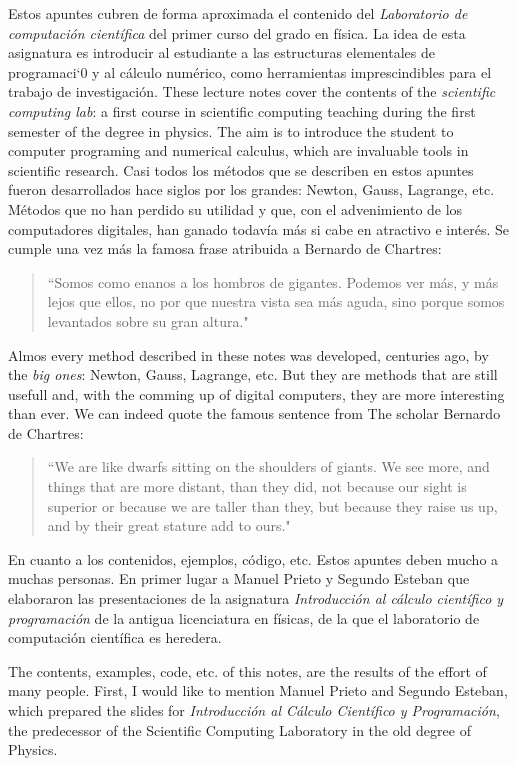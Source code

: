 \begin{paracol}{2}
Estos apuntes cubren de forma aproximada  el contenido del \emph{Laboratorio de computación científica} del primer curso del grado en física.
La idea de esta asignatura es  introducir al estudiante a las estructuras elementales de programaci`0 y al cálculo numérico, como herramientas imprescindibles para el trabajo de investigación.
\switchcolumn
These lecture notes cover the contents  of the \emph{scientific computing lab}: a first course in scientific computing teaching during the first semester of the degree in physics. The aim is to introduce the student to computer programing and numerical calculus, which are invaluable tools in scientific research.
\switchcolumn         
Casi todos los métodos que se describen en estos apuntes fueron desarrollados hace siglos por los grandes: Newton, Gauss, Lagrange, etc.  Métodos que no han perdido su utilidad y que, con el advenimiento de los computadores digitales, han ganado todavía más si cabe en atractivo e interés. Se cumple una vez más la famosa frase atribuida a Bernardo de Chartres:
\begin{quote}
``Somos como enanos a los hombros de gigantes. Podemos ver más, y más lejos que ellos, no por que nuestra vista sea más aguda, sino porque somos levantados sobre su gran altura."
\end{quote}
\switchcolumn
Almos every method described in these notes was developed, centuries ago, by the \emph{big ones}: Newton, Gauss, Lagrange, etc. But they are methods that are still usefull and, with the comming up of digital computers, they are more interesting than ever. We can indeed quote the famous sentence from The scholar Bernardo de Chartres:
\begin{quote}
``We are like dwarfs sitting on the shoulders of giants. We see more, and things that are more distant, than they did, not because our sight is superior or because we are taller than they, but because they raise us up, and by their great stature add to ours."
\end{quote}          

\switchcolumn
En cuanto a los contenidos, ejemplos, código, etc. Estos apuntes deben mucho a muchas personas. En primer lugar a Manuel Prieto y Segundo Esteban que elaboraron las presentaciones de la asignatura \emph{Introducción al cálculo científico y programación} de la antigua licenciatura en físicas, de la que el laboratorio de computación científica es heredera. 

\switchcolumn
The contents, examples, code, etc. of this notes, are the results of the effort of many people. First, I would like to mention  Manuel Prieto and Segundo Esteban, which prepared the slides for \emph{Introducción al Cálculo Científico y Programación}, the predecessor of the Scientific Computing Laboratory in the old degree of Physics.  


\end{paracol}
